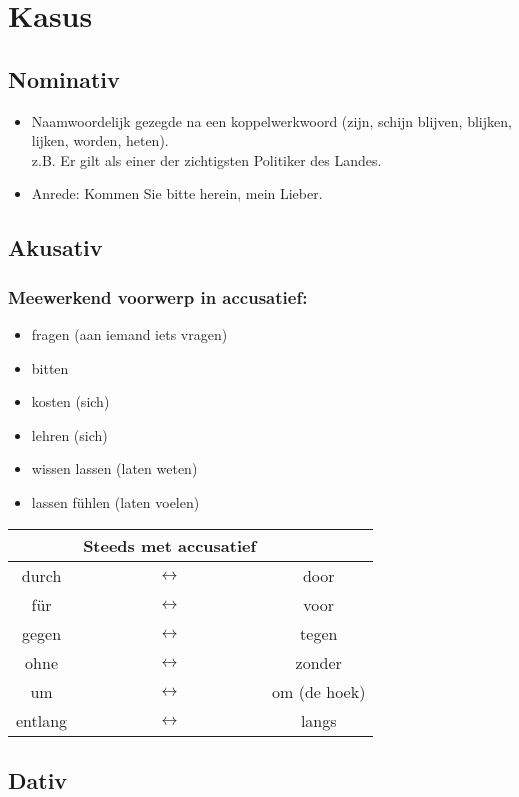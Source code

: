\documentclass[main.tex]{subfiles}
\begin{document}
\chapter{Kasus}


\section{Nominativ}
\begin{itemize}
\item Naamwoordelijk gezegde na een koppelwerkwoord (zijn, schijn blijven, blijken, lijken, worden, heten).\\
z.B. Er gilt als einer der zichtigsten Politiker des Landes.
\item Anrede: Kommen Sie bitte herein, mein Lieber.
\end{itemize}
\section{Akusativ}
\subsection{Meewerkend voorwerp in accusatief:}
\begin{itemize}
\item fragen (aan iemand iets vragen)
\item bitten 
\item kosten (sich)
\item lehren (sich)
\item wissen lassen (laten weten)
\item lassen fühlen (laten voelen)
\end{itemize}

\begin{tabular}{ccc}
 & Steeds met accusatief &  \\ 
\hline
durch & $\leftrightarrow$ & door \\ 
für & $\leftrightarrow$ & voor \\ 
gegen & $\leftrightarrow$ & tegen \\ 
ohne & $\leftrightarrow$ & zonder \\ 
um & $\leftrightarrow$ & om (de hoek) \\ 
entlang & $\leftrightarrow$ & langs \\ 
\end{tabular} 
\section{Dativ}
\end{document}
